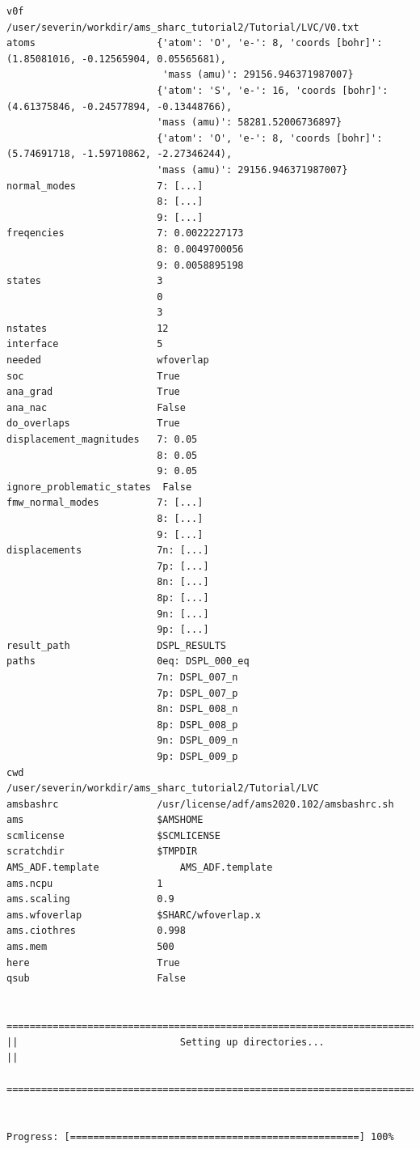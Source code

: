 \documentclass[a4paper,11pt,DIV=15,openany]{scrbook}
\begin{document}
\begin{oframed}
\begin{Verbatim}[commandchars=\\\{\}]
v0f                       /user/severin/workdir/ams_sharc_tutorial2/Tutorial/LVC/V0.txt
atoms                     {'atom': 'O', 'e-': 8, 'coords [bohr]': (1.85081016, -0.12565904, 0.05565681), 
                           'mass (amu)': 29156.946371987007}
                          {'atom': 'S', 'e-': 16, 'coords [bohr]': (4.61375846, -0.24577894, -0.13448766), 
                          'mass (amu)': 58281.52006736897}
                          {'atom': 'O', 'e-': 8, 'coords [bohr]': (5.74691718, -1.59710862, -2.27346244), 
                          'mass (amu)': 29156.946371987007}
normal_modes              7: [...]
                          8: [...]
                          9: [...]
freqencies                7: 0.0022227173
                          8: 0.0049700056
                          9: 0.0058895198
states                    3
                          0
                          3
nstates                   12
interface                 5
needed                    wfoverlap
soc                       True
ana_grad                  True
ana_nac                   False
do_overlaps               True
displacement_magnitudes   7: 0.05
                          8: 0.05
                          9: 0.05
ignore_problematic_states  False
fmw_normal_modes          7: [...]
                          8: [...]
                          9: [...]
displacements             7n: [...]
                          7p: [...]
                          8n: [...] 
                          8p: [...] 
                          9n: [...]
                          9p: [...]
result_path               DSPL_RESULTS
paths                     0eq: DSPL_000_eq
                          7n: DSPL_007_n
                          7p: DSPL_007_p
                          8n: DSPL_008_n
                          8p: DSPL_008_p
                          9n: DSPL_009_n
                          9p: DSPL_009_p
cwd                       /user/severin/workdir/ams_sharc_tutorial2/Tutorial/LVC
amsbashrc                 /usr/license/adf/ams2020.102/amsbashrc.sh
ams                       $AMSHOME
scmlicense                $SCMLICENSE
scratchdir                $TMPDIR
AMS_ADF.template              AMS_ADF.template
ams.ncpu                  1
ams.scaling               0.9
ams.wfoverlap             $SHARC/wfoverlap.x
ams.ciothres              0.998
ams.mem                   500
here                      True
qsub                      False

  ================================================================================
||                            Setting up directories...                           ||
  ================================================================================


Progress: [==================================================] 100%
\end{Verbatim}
\end{oframed}
\end{document}
